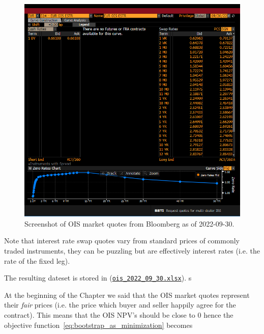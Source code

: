 \begin{figure}[bth]
	\centering
	\includegraphics[width=1.\linewidth]{figures/bbg_ois}
	\caption{Screenshot of OIS market quotes from Bloomberg as of 2022-09-30.}
	\label{fig:icap}
\end{figure}

Note that interest rate swap quotes vary from standard prices of commonly traded instruments, they can be puzzling but are effectively interest rates (i.e. the rate of the fixed leg).

The resulting dateset is stored in (\href{https://github.com/matteosan1/finance_course/raw/master/input_files/ois_2022_09_30.xlsx}{\texttt{ois\_2022\_09\_30.xlsx}}). s

At the beginning of the Chapter we said that the OIS market quotes represent their \emph{fair} prices (i.e. the price which buyer and seller happily agree for the contract). This means that the OIS NPV's should be close to 0 hence the objective function~\ref{eq:bootstrap_as_minimization} becomes

